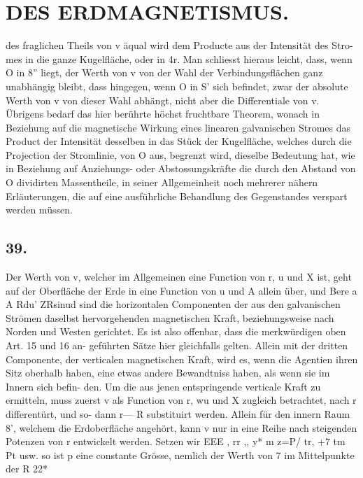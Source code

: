 \documentclass[12pt,a4paper]{article}
\begin{document}
\newpage


\section*{DES ERDMAGNETISMUS.}
des fraglichen Theils von v äqual wird dem Producte aus der Intensität des Stro- mes in die ganze Kugelfläche, oder in 4r. Man schliesst hieraus leicht, dass, wenn O in 8'' liegt, der Werth von v von der Wahl der Verbindungsflächen ganz unabhängig bleibt, dass hingegen, wenn O in S' sich befindet, zwar der absolute Werth von v\guillemotright{} von dieser Wahl abhängt, nicht aber die Differentiale von v. Übrigens bedarf das hier berührte höchst fruchtbare Theorem, wonach in Beziehung auf die magnetische Wirkung eines linearen galvanischen Stromes das Product der Intensität desselben in das Stück der Kugelfläche, welches durch die Projection der Stromlinie, von O aus, begrenzt wird, dieselbe Bedeutung hat, wie in Beziehung auf Anziehungs- oder Abstossungskräfte die durch den Abstand von O dividirten Massentheile, in seiner Allgemeinheit noch mehrerer nähern Erläuterungen, die auf eine ausführliche Behandlung des Gegenstandes verspart werden müssen.

\subsection*{39.}
Der Werth von v, welcher im Allgemeinen eine Function von r, u und X ist, geht auf der Oberfläche der Erde in eine Function von u und A allein über, und Bere a A Rdu' ZRsinud sind die horizontalen Componenten der aus den galvanischen Strömen daselbst hervorgehenden magnetischen Kraft, beziehungsweise nach Norden und Westen gerichtet. Es ist also offenbar, dass die merkwürdigen oben Art. 15 und 16 an- geführten Sätze hier gleichfalls gelten. Allein mit der dritten Componente, der verticalen magnetischen Kraft, wird es, wenn die Agentien ihren Sitz oberhalb haben, eine etwas andere Bewandtniss haben, als wenn sie im Innern sich befin- den. Um die aus jenen entspringende verticale Kraft zu ermitteln, muss zuerst v als Function von r, wu und X zugleich betrachtet, nach r differentürt, und so- dann r--- R substituirt werden. Allein für den innern Raum 8', welchem die Erdoberfläche angehört, kann v nur in eine Reihe nach steigenden Potenzen von r entwickelt werden. Setzen wir EEE , rr ,, y* m z=P/ tr, +7 tm Pt usw. so ist p\textdegree{} eine constante Grösse, nemlich der Werth von 7 im Mittelpunkte der R 22*
\end{document}
